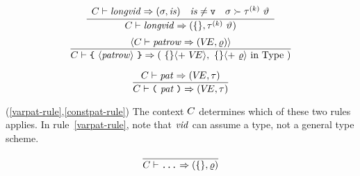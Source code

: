 

\begin{equation}	%
 \label{constpat-rule}
 \frac{\begin{array}{lcr}
      \C\ts\longvid\ra(\tych,\is) &
      \is \neq \vstatus & 
      \tych \succ \apptype{\tauk}{\typeapp} 
      \end{array}}
     {\C\ts\longvid\ra (\emptymap,\apptype{\tauk}{\typeapp})}
 \end{equation}
\begin{equation}	%
\frac{\langle\C\ts\labpats\ra(\VE,\varrho)\rangle}
     {\C\ts\lttbrace\ \recpat\ \rttbrace\ra(\ \emptymap\langle +\ \VE\rangle,\ \emptymap
      \langle +\ \varrho\rangle\ \In\ \Type\ ) }\index{31.1}
\end{equation}

\begin{equation}	%
\frac{\C\ts\pat\ra(\VE,\tau)}
     {\C\ts\parpat\ra(\VE,\tau)}
\end{equation}
\comments
\begin{description}
\item{(\ref{varpat-rule},\ref{constpat-rule})}
The context $C$ determines which of these two rules applies. 
In rule~\ref{varpat-rule}, note
that ${\it vid}$ can assume a type, not a general type scheme.
\end{description}

\begin{equation}	%
\frac{}
     {\C\ts\wildrec\ra(\emptymap,\varrho)}\index{31.2}
\end{equation}

